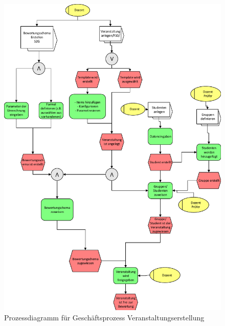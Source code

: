 	
	\begin{figure}[th!]
	\centering
	\includegraphics[width=\textwidth]{./img/ablauf_1}
	\caption{Prozessdiagramm für Geschäftsprozess Veranstaltungserstellung}
	\label{fig:process1}
	\end{figure}
		
